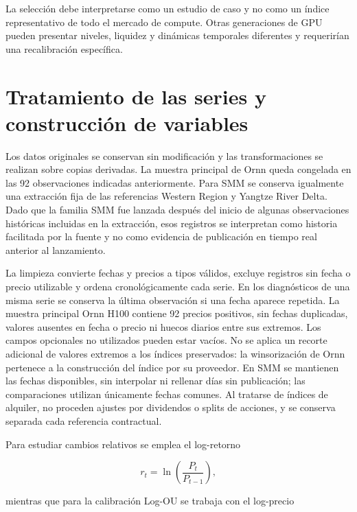 La selección debe interpretarse como un estudio de caso y no como un índice
representativo de todo el mercado de compute. Otras generaciones de GPU pueden
presentar niveles, liquidez y dinámicas temporales diferentes y requerirían una
recalibración específica.

\section{Tratamiento de las series y construcción de variables}
\label{sec:tratamiento_datos}

Los datos originales se conservan sin modificación y las transformaciones se
realizan sobre copias derivadas. La muestra principal de Ornn queda congelada en
las 92 observaciones indicadas anteriormente. Para SMM se conserva igualmente una
extracción fija de las referencias Western Region y Yangtze River Delta. Dado que
la familia SMM fue lanzada después del inicio de algunas observaciones históricas
incluidas en la extracción, esos registros se interpretan como historia facilitada
por la fuente y no como evidencia de publicación en tiempo real anterior al
lanzamiento.

La limpieza convierte fechas y precios a tipos válidos, excluye registros sin
fecha o precio utilizable y ordena cronológicamente cada serie. En los diagnósticos
de una misma serie se conserva la última observación si una fecha aparece repetida.
La muestra principal Ornn H100 contiene 92 precios positivos, sin fechas duplicadas,
valores ausentes en fecha o precio ni huecos diarios entre sus extremos. Los campos
opcionales no utilizados pueden estar vacíos. No se aplica un recorte adicional de
valores extremos a los índices preservados: la winsorización de Ornn pertenece a
la construcción del índice por su proveedor. En SMM se mantienen las fechas
disponibles, sin interpolar ni rellenar días sin publicación; las comparaciones
utilizan únicamente fechas comunes. Al tratarse de índices de alquiler, no proceden
ajustes por dividendos o splits de acciones, y se conserva separada cada referencia
contractual.

Para estudiar cambios relativos se emplea el log-retorno

\begin{equation}
    r_t=\ln\left(\frac{P_t}{P_{t-1}}\right),
    \label{eq:log_return_data}
\end{equation}

mientras que para la calibración Log-OU se trabaja con el log-precio

